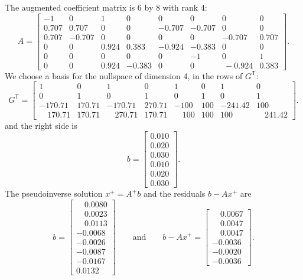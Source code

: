 The augmented coefficient matrix is 6 by 8 with rank 4:
\begin{equation*}
	A =
	\begin{bmatrix}
		-1 & 0 & 1 & 0 & 0 & 0 & 0 & 0\\
		0.707 & 0.707 & 0 & 0 & -0.707 & -0.707 & 0 & 0\\
		0.707 &-0.707& 0 &0 &0& 0& -0.707& 0.707\\
		0 & 0 &0.924& 0.383& -0.924 &-0.383& 0& 0\\
		0& 0 &0 &0 &0 &-1& 0& 1\\
		0& 0 &0.924 &-0.383& 0& 0&\ -0.924& 0.383
	\end{bmatrix}.
\end{equation*}
We choose a basis for the nullspace of dimension 4, in the rows of $G^\mathsf{T}$:
\begin{equation*}
	G^\mathsf{T} =
	\begin{bmatrix}
		1 & 0 & 1 & 0 & 1 & 0 & 1 & 0\\
		0 & 1 & 0 & 1 & 0 & 1 & 0 & 1\\
		-170.71 & 170.71 &-170.71& 270.71& -100 &100& -241.42& 100\\
		\quad170.71& 170.71 &\quad270.71 &170.71& \quad100& 100& 100& \quad241.42
	\end{bmatrix}.
\end{equation*}
and the right side is
\begin{equation*}
	b
	=\begin{bmatrix}
		0.010\\
		0.020\\
		0.030\\
		0.010\\
		0.020\\
		0.030
	\end{bmatrix}.
\end{equation*}
The pseudoinverse solution $x^+ = A^+b$ and the residuals $b - Ax^+$ are
\begin{equation*}
	b
	=\begin{bmatrix}
		\quad 0.008 0\\
		\quad0.002 3\\
		\quad0.0113\\
		-0.0068\\
		-0.0026\\
		-0.0087\\
		-0.0167\\
		0.013 2
	\end{bmatrix}
	\qquad \text{and}  \qquad
	b- Ax^+
	=\begin{bmatrix}
		\quad0.0067\\
		\quad0.0047\\
		\quad0.0047\\
		-0.0036\\
		-0.0020\\
		-0.0036
	\end{bmatrix}.
\end{equation*}
